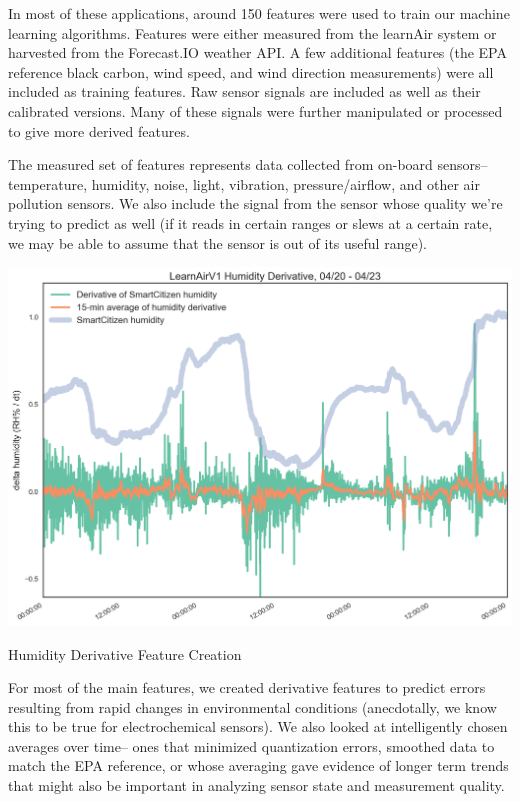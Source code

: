 In most of these applications, around 150 features were used to train our machine learning algorithms.  Features were either measured from the learnAir system or harvested from the Forecast.IO weather API.  A few additional features (the EPA reference black carbon, wind speed, and wind direction measurements) were all included as training features.  Raw sensor signals are included as well as their calibrated versions.  Many of these signals were further manipulated or processed to give more derived features.  

The measured set of features represents data collected from on-board sensors-- temperature, humidity, noise, light, vibration, pressure/airflow, and other air pollution sensors.  We also include the signal from the sensor whose quality we're trying to predict as well (if it reads in certain ranges or slews at a certain rate, we may be able to assume that the sensor is out of its useful range).  

\begin{marginfigure}
 	\includegraphics[width=\textwidth]{figs/humidity_derivative}               
 	 \caption{Humidity Derivative Feature Creation}
  	\label{fig:humidity_derivative}
\end{marginfigure}

For most of the main features, we created derivative features to predict errors resulting from rapid changes in environmental conditions (anecdotally, we know this to be true for electrochemical sensors).  We also looked at intelligently chosen averages over time-- ones that minimized quantization errors, smoothed data to match the EPA reference, or whose averaging gave evidence of longer term trends that might also be important in analyzing sensor state and measurement quality.


